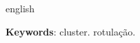 \begin{resumo}[Abstract]
 \begin{otherlanguage*}{english}

   
   
   \vspace{\onelineskip}
 
   \noindent 
   \textbf{Keywords}:  cluster. rotulação.
 \end{otherlanguage*}
\end{resumo}
